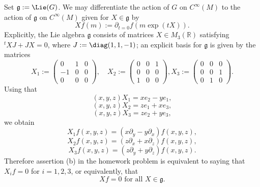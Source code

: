 \documentclass[reqno]{amsart} 
\begin{document}
\begin{itemize}
  Set $\mathfrak{g} := \Lie(G)$.
  We may differentiate the action of $G$ on $C^\infty(M)$
  to the action of $\mathfrak{g}$ on $C^\infty(M)$
  given for $X \in \mathfrak{g}$
  by
  \begin{equation*}
  X f(m) :=
  \partial_{t=0} f(m \exp(t X)).
  \end{equation*}
  Explicitly, the Lie algebra $\mathfrak{g}$
  consists of matrices
  $X \in M_3(\mathbb{R})$
  satisfying ${}^t X J + J X = 0$,
  where $J := \diag(1,1,-1)$;
  an explicit basis for $\mathfrak{g}$ is given by the matrices
  \begin{equation*}
  X_1
  :=
  \begin{pmatrix}
    0 & 1 & 0 \\
    -1 & 0 & 0 \\
    0 & 0 & 0
  \end{pmatrix}
,
  \quad
  X_2
  :=
  \begin{pmatrix}
    0 & 0 & 1 \\
    0 & 0 & 0 \\
    1 & 0 & 0
  \end{pmatrix}
,
  X_3
  :=
  \begin{pmatrix}
    0 & 0 & 0 \\
    0 & 0 & 1 \\
    0 & 1 & 0
  \end{pmatrix}
.
  \end{equation*}
  Using that
  \begin{equation*}
  (x,y,z) X_1
  =
  x e_2
  - y e_1,
  \end{equation*}
  \begin{equation*}
  (x,y,z) X_2
  =
  z e_1
  + x e_3,
  \end{equation*}
  \begin{equation*}
  (x,y,z) X_3
  =
  z e_2
  + y e_3,
  \end{equation*}
  we obtain
  \begin{equation*}
  X_1 f(x,y,z)
  =
  (x \partial_y - y \partial_x) f(x,y,z),
  \end{equation*}
  \begin{equation*}
  X_2 f(x,y,z)
  =
  (z \partial_x + x \partial_z) f(x,y,z),
  \end{equation*}
  \begin{equation*}
  X_3 f(x,y,z)
  =
  (z \partial_y + y \partial_z) f(x,y,z).
  \end{equation*}
  Therefore assertion (b) in the homework problem
  is equivalent to saying that
  $X_i f = 0$ for $i=1,2,3$,
  or equivalently,
  that
  \begin{equation}\label{eq:f-invariant-by-algebra-for-so-1-2-hw-problem}
    X f = 0 \text{ for all }X \in \mathfrak{g}.
  \end{equation}


\end{itemize}
\end{document}
